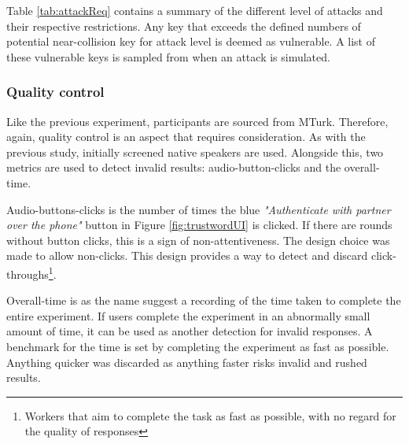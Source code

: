 Table \ref{tab:attackReq} contains a summary of the different level of attacks and their respective restrictions. Any key that exceeds the defined numbers of potential near-collision key for attack level is deemed as vulnerable. A list of these vulnerable keys is sampled from when an attack is simulated.

\subsubsection{Quality control}
\label{sec:exp2_quality}
Like the previous experiment, participants are sourced from MTurk. Therefore, again, quality control is an aspect that requires consideration. As with the previous study, initially screened native speakers are used. Alongside this, two metrics are used to detect invalid results: audio-button-clicks and the overall-time. 

Audio-buttons-clicks is the number of times the blue \textit{"Authenticate with partner over the phone"} button in Figure \ref{fig:trustwordUI} is clicked. If there are rounds without button clicks, this is a sign of non-attentiveness. The design choice was made to allow non-clicks. This design provides a way to detect and discard click-throughs\footnote{Workers that aim to complete the task as fast as possible, with no regard for the quality of responses}. 

Overall-time is as the name suggest a recording of the time taken to complete the entire experiment. If users complete the experiment in an abnormally small amount of time, it can be used as another detection for invalid responses. A benchmark for the time is set by completing the experiment as fast as possible. Anything quicker was discarded as anything faster risks invalid and rushed results.